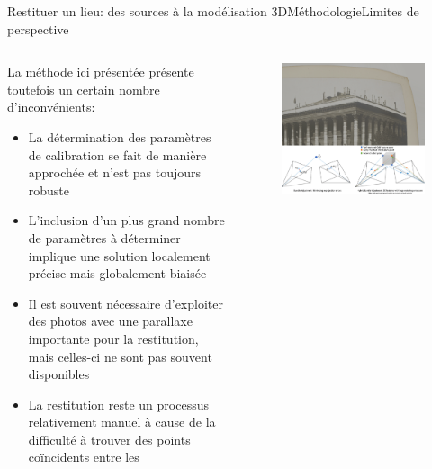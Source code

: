 \documentclass[8pt]{beamer}
\begin{document}
\begin{frame}{Restituer un lieu: des sources à la modélisation 3D}{Méthodologie}{Limites de perspective}
	\begin{columns}[c]
		\begin{column}{0.5\textwidth}
			La méthode ici présentée présente toutefois un certain nombre d’inconvénients:
			\begin{itemize}
				\item La détermination des paramètres de calibration se fait de manière approchée et n’est pas toujours robuste
				\item L’inclusion d’un plus grand nombre de paramètres à déterminer implique une solution localement précise mais globalement biaisée
				\item Il est souvent nécessaire d’exploiter des photos avec une parallaxe importante pour la restitution, mais celles-ci ne sont pas souvent disponibles
				\item La restitution reste un processus relativement manuel à cause de la difficulté à trouver des points coïncidents entre les 
			\end{itemize}
		\end{column}
		\begin{column}{0.5\textwidth}
			\begin{figure}
				\includegraphics[width=\textwidth]{includes/c_slide10.png}
			\end{figure}
		\end{column}
	\end{columns}
\end{frame}
\end{document}
